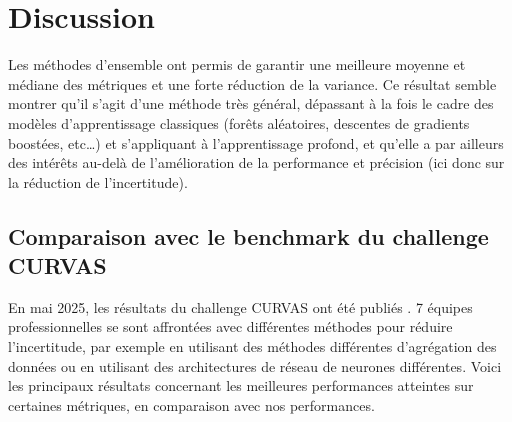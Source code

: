\documentclass[a4paper,french,bookmarks,12pt]{article}
\begin{document}
    \section{Discussion}
    
    Les méthodes d'ensemble ont permis de garantir une meilleure moyenne et médiane des métriques et une forte réduction de la variance. Ce résultat semble montrer qu'il s'agit d'une méthode très général, dépassant à la fois le cadre des modèles d’apprentissage classiques (forêts aléatoires, descentes de gradients boostées, etc\dots{}) et s'appliquant à l’apprentissage profond, et qu'elle a par ailleurs des intérêts au-delà de l'amélioration de la performance et précision (ici donc sur la réduction de l'incertitude).
    
    \subsection{Comparaison avec le benchmark du challenge CURVAS}
    
    En mai 2025, les résultats du challenge CURVAS ont été publiés \parencite{curvasbenchmark}. 7 équipes professionnelles se sont affrontées avec différentes méthodes pour réduire l'incertitude, par exemple en utilisant des méthodes différentes d'agrégation des données ou en utilisant des architectures de réseau de neurones différentes. Voici les principaux résultats concernant les meilleures performances atteintes sur certaines métriques, en comparaison avec nos performances.
\end{document}
